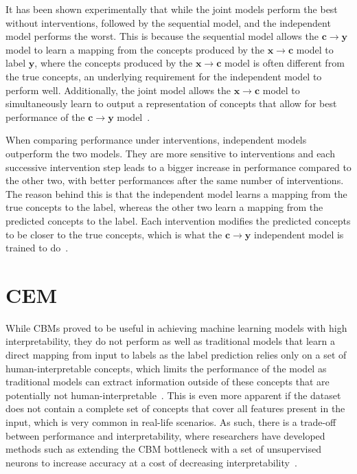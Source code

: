 \documentclass[../main.tex]{subfiles}
\begin{document}
It has been shown experimentally that while the joint models perform the best
without interventions, followed by the sequential model, and the independent model
performs the worst. This is because the sequential model allows the $\mathbf{c} \to \mathbf{y}$ 
model to learn a mapping from the concepts produced by the $\mathbf{x} \to \mathbf{c}$ model to
label $\mathbf{y}$, where the concepts produced by the $\mathbf{x} \to \mathbf{c}$ model is often different
from the true concepts, an underlying requirement for the independent model to perform well. Additionally,
the joint model allows the $\mathbf{x} \to \mathbf{c}$ model to simultaneously learn to output a representation
of concepts that allow for best performance of the $\mathbf{c} \to \mathbf{y}$ model~\cite{cbm}.

When comparing performance under interventions,
independent models outperform the two models.
They are more sensitive to interventions and each successive intervention step
leads to a bigger increase in performance compared to the other two,
with better performances after the same number of interventions.
The reason behind this
is that the independent model learns a mapping from the true concepts to the label,
whereas the other two learn a mapping from the predicted concepts to the label. Each intervention
modifies the predicted concepts to be closer to the true concepts, which is what the 
$\mathbf{c} \to \mathbf{y}$ independent model is trained to do~\cite{cbm}.

\section{CEM}\label{background:cem}

While CBMs proved to be useful in achieving machine learning models with high
interpretability, they do not perform as well as traditional models that learn a direct
mapping from input to labels as the label
prediction relies only on a set of human-interpretable concepts, which limits
the performance of the model as traditional models can extract
information outside of these concepts that are potentially not human-interpretable~\cite{cem}. 
This is even more apparent
if the dataset does not contain a complete set of concepts that cover all
features present in the input, which is very common in real-life scenarios.
As such, there is a trade-off between performance and interpretability, where researchers
have developed methods such as extending the CBM bottleneck with a set of unsupervised neurons
to increase accuracy at a cost of decreasing interpretability~\cite{cbm-hybrid}.
\end{document}
